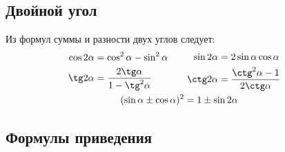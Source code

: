 \subsection{Двойной угол}

Из формул суммы и разности двух углов следует:
$$\begin{gathered}
\begin{aligned}
\begin{aligned}
\cos 2\alpha&=\cos^2\alpha-\sin^2\alpha\\
\tg 2\alpha&=\frac{2\tg\alpha}{1-\tg^2\alpha}
\end{aligned} &\qquad
\begin{aligned}
\sin 2\alpha&=2\sin\alpha\cos\alpha\\
\ctg 2\alpha&=\frac{\ctg^2\alpha-1}{2\ctg\alpha}
\end{aligned}
\end{aligned}\\
(\sin\alpha\pm\cos\alpha)^2=1\pm\sin 2\alpha
\end{gathered}$$

\subsection{Формулы приведения}


